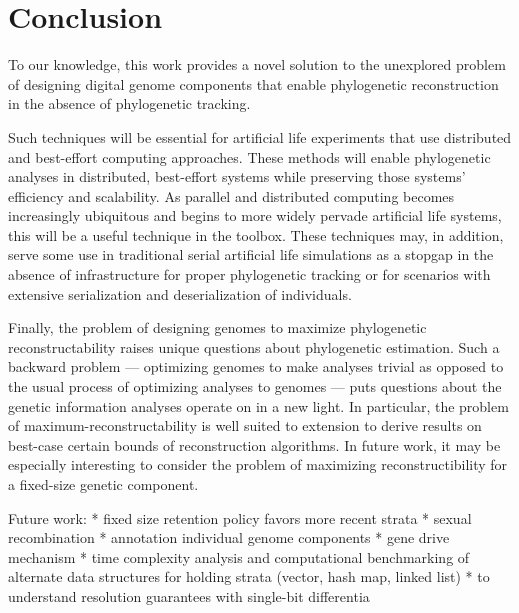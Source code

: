 \section{Conclusion} \label{sec:conclusion}

To our knowledge, this work provides a novel solution to the unexplored problem of designing digital genome components that enable phylogenetic reconstruction in the absence of phylogenetic tracking.

Such techniques will be essential for artificial life experiments that use distributed and best-effort computing approaches.
These methods will enable phylogenetic analyses in distributed, best-effort systems while preserving those systems' efficiency and scalability.
As parallel and distributed computing becomes increasingly ubiquitous and begins to more widely pervade artificial life systems, this will be a useful technique in the toolbox.
These techniques may, in addition, serve some use in traditional serial artificial life simulations as a stopgap in the absence of infrastructure for proper phylogenetic tracking or for scenarios with extensive serialization and deserialization of individuals.

Finally, the problem of designing genomes to maximize phylogenetic reconstructability raises unique questions about phylogenetic estimation.
Such a backward problem --- optimizing genomes to make analyses trivial as opposed to the usual process of optimizing analyses to genomes --- puts questions about the genetic information analyses operate on in a new light.
In particular, the problem of maximum-reconstructability is well suited to extension to derive results on best-case certain bounds of reconstruction algorithms.
In future work, it may be especially interesting to consider the problem of maximizing reconstructibility for a fixed-size genetic component.

Future work:
* fixed size retention policy favors more recent strata
* sexual recombination
  * annotation individual genome components
  * gene drive mechanism
* time complexity analysis and computational benchmarking of alternate data structures for holding strata (vector, hash map, linked list)
* to understand resolution guarantees with single-bit differentia
